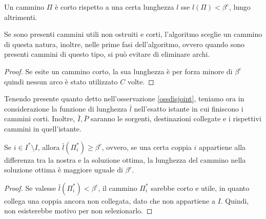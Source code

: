 \begin{definition}
    Un cammino $\Pi$ è corto rispetto a una certa lunghezza $l$ sse
    $l(\Pi) < \beta^c$, lungo altrimenti.
\end{definition}
\begin{remark}
    \label{ossdisjoint}
    Se sono presenti cammini utili non ostruiti e corti, l'algoritmo sceglie un cammino
    di questa natura, inoltre, nelle prime fasi dell'algoritmo, ovvero quando sono presenti cammini
    di questo tipo, si può evitare di eliminare archi.
\end{remark}
\begin{proof}
    Se esite un cammino corto, la sua lunghezza è per forza minore di $\beta^c$ quindi nessun arco 
    è stato utilizzato $C$ volte.
\end{proof}

Tenendo presente quanto detto nell'osservazione \ref{ossdisjoint}, teniamo ora in considerazione 
la funzione di lunghezza $\bar{l}$ nell'esatto istante in cui finiscono i cammini corti.
Inoltre, $\bar{I}, \bar{P}$ saranno le sorgenti, destinazioni collegate e i rispettivi cammini 
in quell'istante.

\begin{lemma}
    \label{ldis1}
    Se $i \in I^* \setminus I$, allora $\bar{l}(\Pi_i^*) \geq \beta^c$, ovvero,
    se una certa coppia $i$ appartiene alla differenza tra la nostra e la soluzione ottima, 
    la lunghezza del cammino nella soluzione ottima è maggiore uguale di $\beta ^c$.
\end{lemma}
\begin{proof}
    Se valesse $\bar{l}(\Pi_i^*) < \beta^c$, il cammino $\Pi_i^*$ sarebbe corto e
    utile, in quanto collega una coppia ancora non collegata, dato che non appartiene a $I$.
    Quindi, non esisterebbe motivo per non selezionarlo.
\end{proof}

